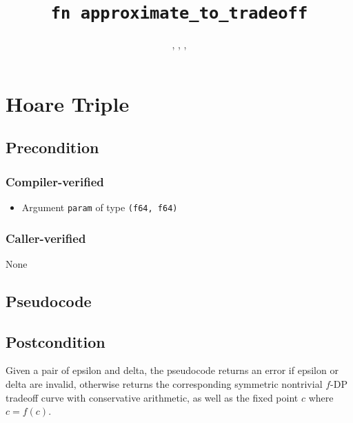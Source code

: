 \documentclass{article}
\title{\texttt{fn approximate\_to\_tradeoff}}
\author{\AishwaryaRamasethuAuthor, \YuJuKuAuthor, \JordanAwanAuthor, \MichaelShoemateAuthor}
\begin{document}
\maketitle

\contrib

\section{Hoare Triple}

\subsection*{Precondition}
\subsubsection*{Compiler-verified}
\begin{itemize}
    \item Argument \texttt{param} of type \texttt{(f64, f64)}
\end{itemize}

\subsubsection*{Caller-verified}
None

\subsection*{Pseudocode}



\subsection*{Postcondition}

\begin{theorem}
    Given a pair of epsilon and delta, the pseudocode returns an error if epsilon or delta are invalid,
    otherwise returns the corresponding symmetric nontrivial $f$-DP tradeoff curve
    with conservative arithmetic,
    as well as the fixed point $c$ where $c = f(c)$.
\end{theorem}
\end{document}
